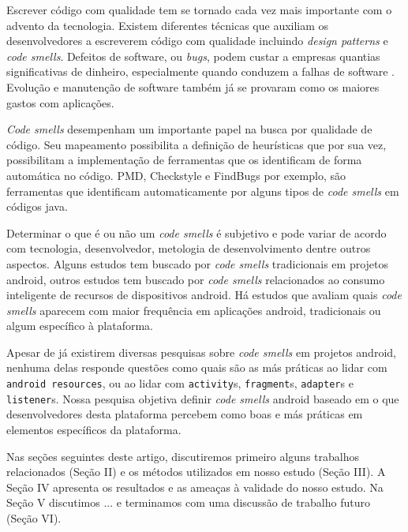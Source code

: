 Escrever c\'odigo com qualidade tem se tornado cada vez mais importante com o advento da tecnologia. Existem diferentes t\'ecnicas que auxiliam os desenvolvedores a escreverem c\'odigo com qualidade incluindo \textit{design patterns} e \textit{code smells}. Defeitos de software, ou \textit{bugs}, podem custar a empresas quantias significativas de dinheiro, especialmente quando conduzem a falhas de software \cite{Nagappan:2005, briand1993modeling}. Evolu\c{c}\~ao e manuten\c{c}\~ao de software tamb\'em j\'a se provaram como os maiores gastos com aplica\c{c}\~oes.

\textit{Code smells} desempenham um importante papel na busca por qualidade de c\'odigo. Seu mapeamento possibilita a defini\c{c}\~ao de heur\'isticas que por sua vez, possibilitam a implementa\c{c}\~ao de ferramentas que os identificam de forma autom\'atica no c\'odigo. PMD, Checkstyle e FindBugs por exemplo, s\~ao ferramentas que identificam automaticamente por alguns tipos de \textit{code smells} em c\'odigos java.

Determinar o que \'e ou n\~ao um \textit{code smells} \'e subjetivo e pode variar de acordo com tecnologia, desenvolvedor, metologia de desenvolvimento dentre outros aspectos. Alguns estudos tem buscado por \textit{code smells} tradicionais em projetos android, outros estudos tem buscado por \textit{code smells} relacionados ao consumo inteligente de recursos de dispositivos android. H\'a estudos que avaliam quais \textit{code smells} aparecem com maior frequ\^encia em aplica\c{c}\~oes android, tradicionais ou algum espec\'ifico \`a plataforma.

Apesar de j\'a existirem diversas pesquisas sobre \textit{code smells} em projetos android, nenhuma delas responde quest\~oes como quais s\~ao as m\'as pr\'aticas ao lidar com \texttt{android resources}, ou ao lidar com \texttt{activity}s, \texttt{fragment}s, \texttt{adapter}s e \texttt{listener}s. Nossa pesquisa objetiva definir \textit{code smells} android baseado em o que desenvolvedores desta plataforma percebem como boas e m\'as pr\'aticas em elementos espec\'ificos da plataforma.

Nas se\c{c}\~oes seguintes deste artigo, discutiremos primeiro alguns trabalhos relacionados (Se\c{c}\~ao II) e os m\'etodos utilizados em nosso estudo (Se\c{c}\~ao III). A Se\c{c}\~ao IV apresenta os resultados e as amea\c{c}as \`a validade do nosso estudo. Na Se\c{c}\~ao V discutimos ... e terminamos com uma discuss\~ao de trabalho futuro (Se\c{c}\~ao VI).
